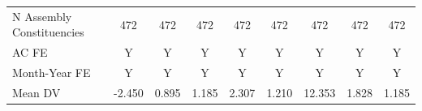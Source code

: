 {\begin{tabular}{l*{8}{c}}
N Assembly Constituencies&         472         &         472         &         472         &         472         &         472         &         472         &         472         &         472         \\
AC FE       &           Y         &           Y         &           Y         &           Y         &           Y         &           Y         &           Y         &           Y         \\
Month-Year FE&           Y         &           Y         &           Y         &           Y         &           Y         &           Y         &           Y         &           Y         \\
Mean DV     &      -2.450         &       0.895         &       1.185         &       2.307         &       1.210         &      12.353         &       1.828         &       1.185         \\
\bottomrule
\end{tabular}
}
